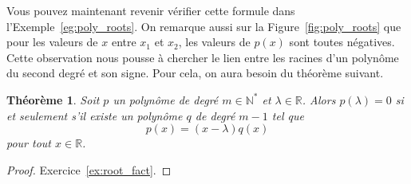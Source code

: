 \documentclass[12pt,a4paper]{article}
\theoremstyle{plain}
\newtheorem{theorem}{Théorème}[section]
\theoremstyle{definition}
\theoremstyle{remark}
\begin{document}
Vous pouvez maintenant revenir vérifier cette formule dans l'Exemple~\ref{eg:poly_roots}.
On remarque aussi sur la Figure~\ref{fig:poly_roots} que pour les valeurs de $x$
entre $x_1$ et $x_2$, les valeurs de $p(x)$ sont toutes négatives. Cette
observation nous pousse à chercher le lien entre les racines d'un polynôme du
second degré et son signe. Pour cela, on aura besoin du théorème suivant.

\begin{tcolorbox}[navybar]
  \begin{theorem}
    Soit $p$ un polynôme de degré $m \in \mathbb{N}^*$ et $\lambda \in \mathbb{R}$.
    Alors $p(\lambda) = 0$ si et seulement s'il existe un polynôme $q$ de degré
    $m - 1$ tel que
    \[
    p(x) = (x - \lambda)q(x)
    \]
    pour tout $x \in \mathbb{R}$.
  \end{theorem}
\end{tcolorbox}

\begin{proof}
  Exercice~\ref{ex:root_fact}.
\end{proof}
\end{document}
